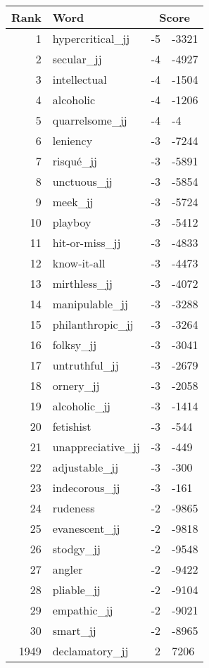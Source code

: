 \begin{longtable}[!htbp]{| rlr@{.}l |}
    \hline
    \textbf{Rank} & \textbf{Word} & \multicolumn{2}{c|}{\textbf{Score}} \\
    \hline
    \endhead
    1 & hypercritical\_jj & -5 & -3321 \\
    2 & secular\_jj & -4 & -4927 \\
    3 & intellectual & -4 & -1504 \\
    4 & alcoholic & -4 & -1206 \\
    5 & quarrelsome\_jj & -4 & -4 \\
    6 & leniency & -3 & -7244 \\
    7 & risqué\_jj & -3 & -5891 \\
    8 & unctuous\_jj & -3 & -5854 \\
    9 & meek\_jj & -3 & -5724 \\
    10 & playboy & -3 & -5412 \\
    11 & hit-or-miss\_jj & -3 & -4833 \\
    12 & know-it-all & -3 & -4473 \\
    13 & mirthless\_jj & -3 & -4072 \\
    14 & manipulable\_jj & -3 & -3288 \\
    15 & philanthropic\_jj & -3 & -3264 \\
    16 & folksy\_jj & -3 & -3041 \\
    17 & untruthful\_jj & -3 & -2679 \\
    18 & ornery\_jj & -3 & -2058 \\
    19 & alcoholic\_jj & -3 & -1414 \\
    20 & fetishist & -3 & -544 \\
    21 & unappreciative\_jj & -3 & -449 \\
    22 & adjustable\_jj & -3 & -300 \\
    23 & indecorous\_jj & -3 & -161 \\
    24 & rudeness & -2 & -9865 \\
    25 & evanescent\_jj & -2 & -9818 \\
    26 & stodgy\_jj & -2 & -9548 \\
    27 & angler & -2 & -9422 \\
    28 & pliable\_jj & -2 & -9104 \\
    29 & empathic\_jj & -2 & -9021 \\
    30 & smart\_jj & -2 & -8965 \\
    1949 & declamatory\_jj & 2 & 7206 \\

\end{longtable}
